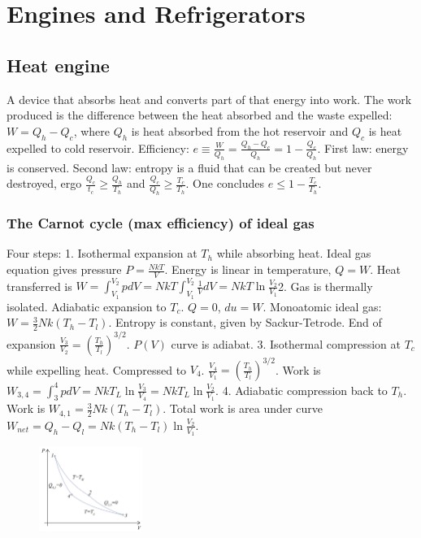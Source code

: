 \documentclass[11pt,twocolumn]{amsart}
\begin{document}
\section{Engines and Refrigerators}
\subsection{Heat engine} A device that absorbs heat and converts part of that energy into work. The work produced is the difference between the heat absorbed and the waste expelled: $W = Q_h-Q_c$, where $Q_h$ is heat absorbed from the hot reservoir and $Q_c$ is heat expelled to cold reservoir. Efficiency: $e \equiv \frac{W}{Q_h} = \frac{Q_h-Q_c}{Q_h} = 1 - \frac{Q_c}{Q_h}$. First law: energy is conserved. Second law: entropy is a fluid that can be created but never destroyed, ergo $\frac{Q_c}{t_c} \geq \frac{Q_h}{T_h}$ and $\frac{Q_c}{Q_h} \geq \frac{T_c}{T_h}$. One concludes $e \leq 1 - \frac{T_c}{T_h}$.
\subsubsection{The Carnot cycle (max efficiency) of ideal gas} Four steps: 1. Isothermal expansion at $T_h$ while absorbing heat. Ideal gas equation gives pressure $P = \frac{NkT}{V}$. Energy is linear in temperature, $Q = W$. Heat transferred is $W = \int_{V_1}^{V_2} pdV = NkT \int_{V_1}^{V_2} \frac{1}{V} dV = NkT \ln \frac{V_2}{V_1} $2. Gas is thermally isolated. Adiabatic expansion to $T_c$. $Q = 0$, $du = W$. Monoatomic ideal gas: $W = \frac{3}{2}Nk(T_h -T_l)$. Entropy is constant, given by Sackur-Tetrode. End of expansion $\frac{V_3}{V_2}=\left(\frac{T_h}{T_l} \right)^{3/2}$. $P(V)$ curve is adiabat. 3. Isothermal compression at $T_c$ while expelling heat. Compressed to $V_4$. $\frac{V_4}{V_1} = \left(\frac{T_h}{T_l}\right)^{3/2}$. Work is $W_{3,4} = \int_3^4 pdV = NkT_L \ln \frac{V_3}{V_4} = NkT_L \ln \frac{V_2}{V_1}$. 4. Adiabatic compression back to $T_h$. Work is $W_{4,1}=\frac{3}{2}Nk(T_h - T_l)$. Total work is area under curve $W_{net} = Q_h - Q_l = Nk(T_h - T_l) \ln\frac{V_2}{V_1}$.
\begin{figure}
	\includegraphics[width=0.30\textwidth]{carnot.png}
\end{figure}
\end{document}

